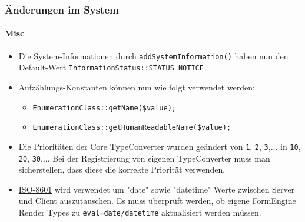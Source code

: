 \begin{frame}[fragile]
	\frametitle{Änderungen im System}
	\framesubtitle{Misc}


	\begin{itemize}
		\item Die System-Informationen durch \texttt{addSystemInformation()} haben nun den Default-Wert
			\texttt{InformationStatus::STATUS\_NOTICE}
		\item Aufzählungs-Konstanten können nun wie folgt verwendet werden:

			\begin{itemize}
				\item \texttt{EnumerationClass::getName(\$value);}
				\item \texttt{EnumerationClass::getHumanReadableName(\$value);}
			\end{itemize}

		\item Die Prioritäten der Core TypeConverter wurden geändert von\newline
			\texttt{1}, \texttt{2}, \texttt{3},... in \texttt{10}, \texttt{20}, \texttt{30},...
			Bei der Registrierung von eigenen TypeConverter muss man sicherstellen, dass diese die korrekte Priorität verwenden.

		\item \href{https://en.wikipedia.org/wiki/ISO_8601}{ISO-8601} wird verwendet um "date" sowie "datetime" Werte zwischen Server und Client auszutauschen. Es muss überprüft werden, ob eigene FormEngine Render Types zu \texttt{eval=date/datetime} aktualisiert werden müssen.

	\end{itemize}

\end{frame}

